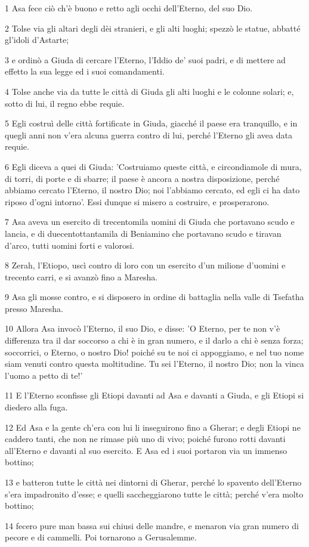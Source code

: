 \par 1 Asa fece ciò ch'è buono e retto agli occhi dell'Eterno, del suo Dio.
\par 2 Tolse via gli altari degli dèi stranieri, e gli alti luoghi; spezzò le statue, abbatté gl'idoli d'Astarte;
\par 3 e ordinò a Giuda di cercare l'Eterno, l'Iddio de' suoi padri, e di mettere ad effetto la sua legge ed i suoi comandamenti.
\par 4 Tolse anche via da tutte le città di Giuda gli alti luoghi e le colonne solari; e, sotto di lui, il regno ebbe requie.
\par 5 Egli costruì delle città fortificate in Giuda, giacché il paese era tranquillo, e in quegli anni non v'era alcuna guerra contro di lui, perché l'Eterno gli avea data requie.
\par 6 Egli diceva a quei di Giuda: 'Costruiamo queste città, e circondiamole di mura, di torri, di porte e di sbarre; il paese è ancora a nostra disposizione, perché abbiamo cercato l'Eterno, il nostro Dio; noi l'abbiamo cercato, ed egli ci ha dato riposo d'ogni intorno'. Essi dunque si misero a costruire, e prosperarono.
\par 7 Asa aveva un esercito di trecentomila uomini di Giuda che portavano scudo e lancia, e di duecentottantamila di Beniamino che portavano scudo e tiravan d'arco, tutti uomini forti e valorosi.
\par 8 Zerah, l'Etiopo, uscì contro di loro con un esercito d'un milione d'uomini e trecento carri, e si avanzò fino a Maresha.
\par 9 Asa gli mosse contro, e si disposero in ordine di battaglia nella valle di Tsefatha presso Maresha.
\par 10 Allora Asa invocò l'Eterno, il suo Dio, e disse: 'O Eterno, per te non v'è differenza tra il dar soccorso a chi è in gran numero, e il darlo a chi è senza forza; soccorrici, o Eterno, o nostro Dio! poiché su te noi ci appoggiamo, e nel tuo nome siam venuti contro questa moltitudine. Tu sei l'Eterno, il nostro Dio; non la vinca l'uomo a petto di te!'
\par 11 E l'Eterno sconfisse gli Etiopi davanti ad Asa e davanti a Giuda, e gli Etiopi si diedero alla fuga.
\par 12 Ed Asa e la gente ch'era con lui li inseguirono fino a Gherar; e degli Etiopi ne caddero tanti, che non ne rimase più uno di vivo; poiché furono rotti davanti all'Eterno e davanti al suo esercito. E Asa ed i suoi portaron via un immenso bottino;
\par 13 e batteron tutte le città nei dintorni di Gherar, perché lo spavento dell'Eterno s'era impadronito d'esse; e quelli saccheggiarono tutte le città; perché v'era molto bottino;
\par 14 fecero pure man bassa sui chiusi delle mandre, e menaron via gran numero di pecore e di cammelli. Poi tornarono a Gerusalemme.

